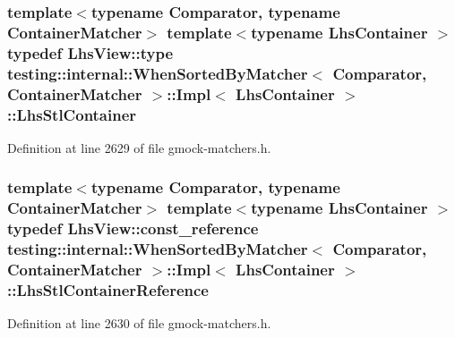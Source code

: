 \subsubsection[{\texorpdfstring{Lhs\+Stl\+Container}{LhsStlContainer}}]{\setlength{\rightskip}{0pt plus 5cm}template$<$typename Comparator, typename Container\+Matcher$>$ template$<$typename Lhs\+Container $>$ typedef {\bf Lhs\+View\+::type} {\bf testing\+::internal\+::\+When\+Sorted\+By\+Matcher}$<$ Comparator, Container\+Matcher $>$\+::{\bf Impl}$<$ Lhs\+Container $>$\+::{\bf Lhs\+Stl\+Container}}\hypertarget{classtesting_1_1internal_1_1_when_sorted_by_matcher_1_1_impl_a2cb1a8d85ca2c376b6abdbcb00d84759}{}\label{classtesting_1_1internal_1_1_when_sorted_by_matcher_1_1_impl_a2cb1a8d85ca2c376b6abdbcb00d84759}


Definition at line 2629 of file gmock-\/matchers.\+h.

\subsubsection[{\texorpdfstring{Lhs\+Stl\+Container\+Reference}{LhsStlContainerReference}}]{\setlength{\rightskip}{0pt plus 5cm}template$<$typename Comparator, typename Container\+Matcher$>$ template$<$typename Lhs\+Container $>$ typedef {\bf Lhs\+View\+::const\+\_\+reference} {\bf testing\+::internal\+::\+When\+Sorted\+By\+Matcher}$<$ Comparator, Container\+Matcher $>$\+::{\bf Impl}$<$ Lhs\+Container $>$\+::{\bf Lhs\+Stl\+Container\+Reference}}\hypertarget{classtesting_1_1internal_1_1_when_sorted_by_matcher_1_1_impl_ab5e53a762bb213ccf84299b31c825b58}{}\label{classtesting_1_1internal_1_1_when_sorted_by_matcher_1_1_impl_ab5e53a762bb213ccf84299b31c825b58}


Definition at line 2630 of file gmock-\/matchers.\+h.

